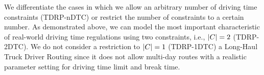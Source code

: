 \begin{namedproblem}
\end{namedproblem}

We differentiate the cases in which we allow an arbitrary number of driving time constraints (TDRP-nDTC) or restrict the number of constraints to a certain number. As demonstrated above, we can model the most important characteristic of real-world driving time regulations using two constraints, i.e., $|C| = 2$ (TDRP-2DTC). We do not consider a restriction to $|C| = 1$ (TDRP-1DTC) a Long-Haul Truck Driver Routing since it does not allow multi-day routes with a realistic parameter setting for driving time limit and break time.